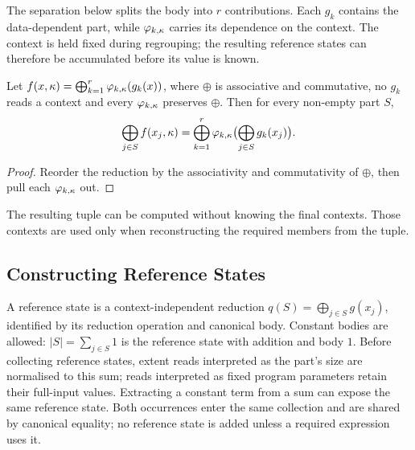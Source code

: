 The separation below splits the body into $r$ contributions.
Each $g_k$ contains the data-dependent part, while $\varphi_{k,\kappa}$ carries its dependence on the context.
The context is held fixed during regrouping; the resulting reference states can therefore be accumulated before its value is known.

\begin{lemma}[Regrouping]
\label{lem:regroup}
Let $f(x,\kappa)=\bigoplus_{k=1}^{r}\varphi_{k,\kappa}(g_k(x))$, where $\oplus$ is associative and commutative, no $g_k$ reads a context and every $\varphi_{k,\kappa}$ preserves $\oplus$.
Then for every non-empty part $S$,
\[
\bigoplus_{j\in S} f(x_j,\kappa)=\bigoplus_{k=1}^{r}\varphi_{k,\kappa}\bigl(\bigoplus_{j\in S} g_k(x_j)\bigr).
\]
\end{lemma}

\begin{proof}
Reorder the reduction by the associativity and commutativity of $\oplus$, then pull each $\varphi_{k,\kappa}$ out.
\end{proof}

The resulting tuple can be computed without knowing the final contexts. Those contexts are used only when reconstructing the required members from the tuple.

\subsection{Constructing Reference States}
\label{sec:judge}

A reference state is a context-independent reduction $q(S)=\bigoplus_{j\in S}g(x_j)$, identified by its reduction operation and canonical body.
Constant bodies are allowed: $|S|=\sum_{j\in S}1$ is the reference state with addition and body $1$.
Before collecting reference states, extent reads interpreted as the part's size are normalised to this sum; reads interpreted as fixed program parameters retain their full-input values.
Extracting a constant term from a sum can expose the same reference state.
Both occurrences enter the same collection and are shared by canonical equality; no reference state is added unless a required expression uses it.

